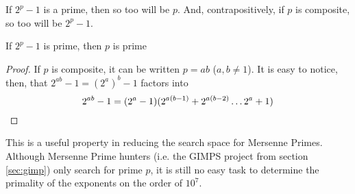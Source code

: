 If $2^p-1$ is a prime, then so too will be $p$. And, contrapositively, if $p$ is composite,
so too will be $2^p-1$. \cite{LighNeal}
\begin{thm}
If $2^p-1$ is prime, then $p$ is prime
\end{thm}
\begin{proof}
 If $p$ is composite, it can be written $p = ab$ ($a,b \ne 1$). It is easy to notice, then,
that $2^{ab} - 1 = (2^a)^b - 1$ factors into 
\begin{equation}
2^{ab} - 1 = (2^a-1)(2^{a(b-1)} + 2^{a(b-2)} \ldots 2^{a} + 1)\qedhere
\label{eqn:composite}
\end{equation}
\end{proof}
This is a useful property in reducing the search space for Mersenne Primes. Although Mersenne Prime hunters
(i.e. the GIMPS project from section \ref{sec:gimp}) only search for prime $p$, it is still no easy task to determine the primality of the exponents on the order of $10^{7}$.



